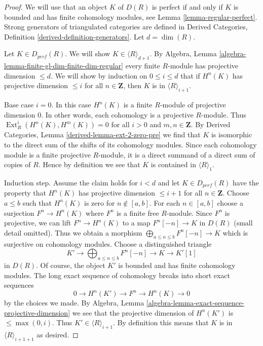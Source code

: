 \documentclass[10pt,a4paper]{amsart}
\theoremstyle{plain}
\theoremstyle{definition}
\theoremstyle{remark}
\numberwithin{equation}{subsection}
\def\Ext{\mathop{\mathrm{Ext}}\nolimits}
\begin{document}
\begin{proof}
We will use that an object $K$ of $D(R)$ is perfect if and only
if $K$ is bounded and has finite cohomology modules, see
Lemma \ref{lemma-regular-perfect}.
Strong generators of triangulated categories are defined in
Derived Categories, Definition \ref{derived-definition-generators}.
Let $d = \dim(R)$.

\medskip\noindent
Let $K \in D_{perf}(R)$. We will show $K \in \langle R \rangle_{d + 1}$.
By Algebra, Lemma \ref{algebra-lemma-finite-gl-dim-finite-dim-regular}
every finite $R$-module has projective dimension $\leq d$.
We will show by induction on $0 \leq i \leq d$ that
if $H^n(K)$ has projective dimension $\leq i$ for all
$n \in \mathbf{Z}$, then $K$ is in $\langle R \rangle_{i + 1}$.

\medskip\noindent
Base case $i = 0$. In this case $H^n(K)$ is a finite $R$-module
of projective dimension $0$. In other words, each cohomology
is a projective $R$-module. Thus $\Ext^i_R(H^n(K), H^m(K)) = 0$
for all $i > 0$ and $m, n \in \mathbf{Z}$. By
Derived Categories, Lemma \ref{derived-lemma-ext-2-zero-pre}
we find that $K$ is isomorphic to the direct sum of the shifts of its
cohomology modules. Since each cohomology module is a finite
projective $R$-module, it is a direct summand of a direct sum
of copies of $R$. Hence by definition we see that $K$
is contained in $\langle R \rangle_1$.

\medskip\noindent
Induction step. Assume the claim holds for $i < d$ and let
$K \in D_{perf}(R)$ have the property that $H^n(K)$ has
projective dimension $\leq i + 1$ for all $n \in \mathbf{Z}$.
Choose $a \leq b$ such that $H^n(K)$ is zero for $n \not \in [a, b]$.
For each $n \in [a, b]$ choose a surjection $F^n \to H^n(K)$
where $F^n$ is a finite free $R$-module. Since $F^n$ is projective,
we can lift $F^n \to H^n(K)$ to a map $F^n[-n] \to K$ in $D(R)$
(small detail omitted). Thus we obtain a morphism
$\bigoplus_{a \leq n \leq b} F^n[-n] \to K$
which is surjective on cohomology modules.
Choose a distinguished triangle
$$
K' \to \bigoplus\nolimits_{a \leq n \leq b} F^n[-n] \to K \to K'[1]
$$
in $D(R)$. Of course, the object $K'$ is bounded and has
finite cohomology modules. The long exact sequence of cohomology
breaks into short exact sequences
$$
0 \to H^n(K') \to F^n \to H^n(K) \to 0
$$
by the choices we made. By
Algebra, Lemma \ref{algebra-lemma-exact-sequence-projective-dimension}
we see that the projective dimension of $H^n(K')$ is $\leq \max(0, i)$.
Thus $K' \in \langle R \rangle_{i + 1}$. By definition this means
that $K$ is in $\langle R \rangle_{i + 1 + 1}$ as desired.
\end{proof}
\end{document}
